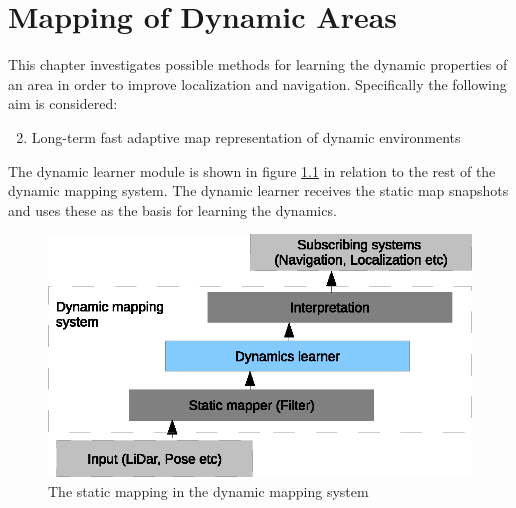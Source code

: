 \chapter{Mapping of Dynamic Areas}
\label{mapping_of_dynamic_areas}
This chapter investigates possible methods for learning the dynamic properties of an area in order to improve localization and navigation.
Specifically the following aim is considered:

\begin{enumerate}
    \setcounter{enumi}{1}
    \item Long-term fast adaptive map representation of dynamic environments
\end{enumerate}

The dynamic learner module is shown in figure \ref{fig:dynamic_learner_overview} in relation to the rest of the dynamic mapping system. The dynamic learner receives the static map snapshots and uses these as the basis for learning the dynamics.  

\begin{figure}[htbp]
	\centering
	\includegraphics[scale=1]{chapters/mapping_of_dynamic_areas/figures/dynamic_overview.eps}
	\caption{The static mapping in the dynamic mapping system}
	\label{fig:dynamic_learner_overview}
\end{figure}








